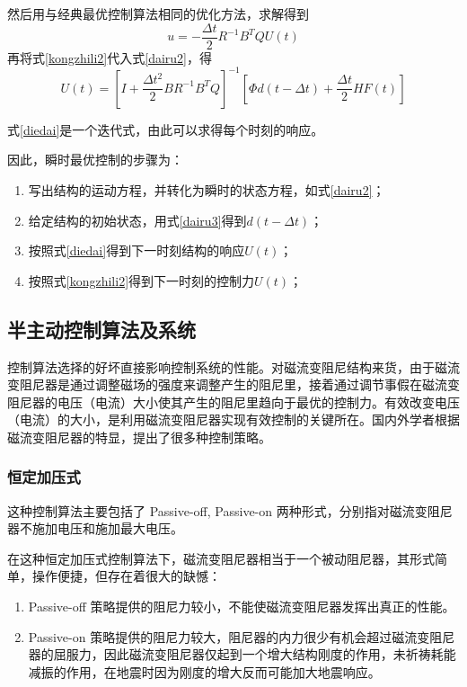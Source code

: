 然后用与经典最优控制算法相同的优化方法，求解得到
\begin{equation}
u=-\frac{\Delta t}{2}R^{-1}B^TQU(t)    \label{kongzhili2}
\end{equation}
再将式\eqref{kongzhili2}代入式\eqref{dairu2}，得
\begin{equation}
U(t)=\left[I+\frac{\Delta t^2}{2}BR^{-1}B^TQ\right]^{-1}\left[\Phi d(t-\Delta t) +\frac{\Delta t}{2}HF(t)\right]  \label{diedai}
\end{equation}

式\eqref{diedai}是一个迭代式，由此可以求得每个时刻的响应。

因此，瞬时最优控制的步骤为：
\begin{enumerate}
\item 写出结构的运动方程，并转化为瞬时的状态方程，如式\eqref{dairu2}；
\item 给定结构的初始状态，用式\eqref{dairu3}得到$d(t-\Delta t)$；
\item 按照式\eqref{diedai}得到下一时刻结构的响应$U(t)$；
\item 按照式\eqref{kongzhili2}得到下一时刻的控制力$U(t)$；
\end{enumerate}


\subsection{半主动控制算法及系统}
控制算法选择的好坏直接影响控制系统的性能。对磁流变阻尼结构来货，由于磁流变阻尼器是通过调整磁场的强度来调整产生的阻尼里，接着通过调节事假在磁流变阻尼器的电压（电流）大小使其产生的阻尼里趋向于最优的控制力。有效改变电压（电流）的大小，是利用磁流变阻尼器实现有效控制的关键所在。国内外学者根据磁流变阻尼器的特显，提出了很多种控制策略。

\subsubsection{恒定加压式}
这种控制算法主要包括了 Passive-off, Passive-on 两种形式，分别指对磁流变阻尼器不施加电压和施加最大电压。

在这种恒定加压式控制算法下，磁流变阻尼器相当于一个被动阻尼器，其形式简单，操作便捷，但存在着很大的缺憾：
\begin{enumerate}
\item Passive-off 策略提供的阻尼力较小，不能使磁流变阻尼器发挥出真正的性能。
\item Passive-on 策略提供的阻尼力较大，阻尼器的内力很少有机会超过磁流变阻尼器的屈服力，因此磁流变阻尼器仅起到一个增大结构刚度的作用，未祈祷耗能减振的作用，在地震时因为刚度的增大反而可能加大地震响应。
\end{enumerate}

